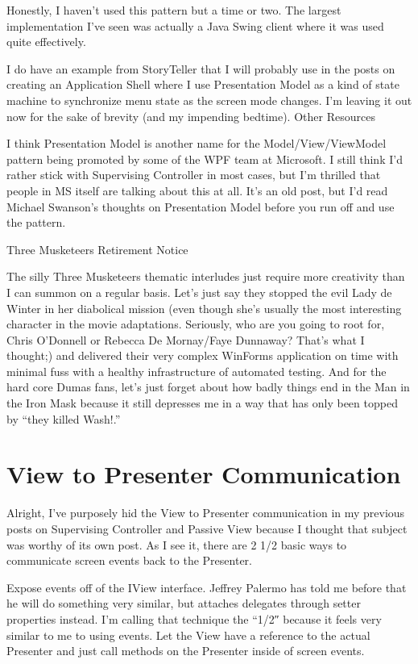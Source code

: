 \documentclass{article}
\begin{document}
{Honestly, I haven't used this pattern but a time or two.  The largest implementation I've seen was actually a Java Swing client where it was used quite effectively. 

I do have an example from StoryTeller that I will probably use in the posts on creating an Application Shell where I use Presentation Model as a kind of state machine to synchronize menu state as the screen mode changes.  I'm leaving it out now for the sake of brevity (and my impending bedtime).
Other Resources

    I think Presentation Model is another name for the Model/View/ViewModel pattern being promoted by some of the WPF team at Microsoft.  I still think I'd rather stick with Supervising Controller in most cases, but I'm thrilled that people in MS itself are talking about this at all.
    It's an old post, but I'd read Michael Swanson's thoughts on Presentation Model before you run off and use the pattern.

 
Three Musketeers Retirement Notice

The silly Three Musketeers thematic interludes just require more creativity than I can summon on a regular basis.  Let's just say they stopped the evil Lady de Winter in her diabolical mission (even though she's usually the most interesting character in the movie adaptations.  Seriously, who are you going to root for, Chris O'Donnell or Rebecca De Mornay/Faye Dunnaway?  That's what I thought;) and delivered their very complex WinForms application on time with minimal fuss with a healthy infrastructure of automated testing.  And for the hard core Dumas fans, let's just forget about how badly things end in the Man in the Iron Mask because it still depresses me in a way that has only been topped by “they killed Wash!.”

\section{ View to Presenter Communication } 

Alright, I've purposely hid the View to Presenter communication in my previous posts on Supervising Controller and Passive View because I thought that subject was worthy of its own post.  As I see it, there are 2 1/2 basic ways to communicate screen events back to the Presenter.

    Expose events off of the IView interface.  Jeffrey Palermo has told me before that he will do something very similar, but attaches delegates through setter properties instead.  I'm calling that technique the “1/2″ because it feels very similar to me to using events.
    Let the View have a reference to the actual Presenter and just call methods on the Presenter inside of screen events.

}
\end{document}
